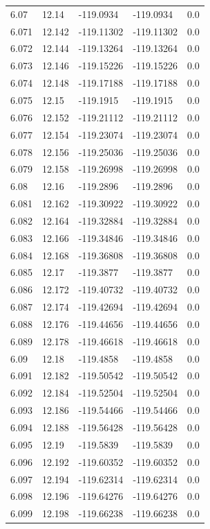 \begin{tabular}{lllll}
6.07 & 12.14 & -119.0934 & -119.0934 & 0.0 \\
6.071 & 12.142 & -119.11302 & -119.11302 & 0.0 \\
6.072 & 12.144 & -119.13264 & -119.13264 & 0.0 \\
6.073 & 12.146 & -119.15226 & -119.15226 & 0.0 \\
6.074 & 12.148 & -119.17188 & -119.17188 & 0.0 \\
6.075 & 12.15 & -119.1915 & -119.1915 & 0.0 \\
6.076 & 12.152 & -119.21112 & -119.21112 & 0.0 \\
6.077 & 12.154 & -119.23074 & -119.23074 & 0.0 \\
6.078 & 12.156 & -119.25036 & -119.25036 & 0.0 \\
6.079 & 12.158 & -119.26998 & -119.26998 & 0.0 \\
6.08 & 12.16 & -119.2896 & -119.2896 & 0.0 \\
6.081 & 12.162 & -119.30922 & -119.30922 & 0.0 \\
6.082 & 12.164 & -119.32884 & -119.32884 & 0.0 \\
6.083 & 12.166 & -119.34846 & -119.34846 & 0.0 \\
6.084 & 12.168 & -119.36808 & -119.36808 & 0.0 \\
6.085 & 12.17 & -119.3877 & -119.3877 & 0.0 \\
6.086 & 12.172 & -119.40732 & -119.40732 & 0.0 \\
6.087 & 12.174 & -119.42694 & -119.42694 & 0.0 \\
6.088 & 12.176 & -119.44656 & -119.44656 & 0.0 \\
6.089 & 12.178 & -119.46618 & -119.46618 & 0.0 \\
6.09 & 12.18 & -119.4858 & -119.4858 & 0.0 \\
6.091 & 12.182 & -119.50542 & -119.50542 & 0.0 \\
6.092 & 12.184 & -119.52504 & -119.52504 & 0.0 \\
6.093 & 12.186 & -119.54466 & -119.54466 & 0.0 \\
6.094 & 12.188 & -119.56428 & -119.56428 & 0.0 \\
6.095 & 12.19 & -119.5839 & -119.5839 & 0.0 \\
6.096 & 12.192 & -119.60352 & -119.60352 & 0.0 \\
6.097 & 12.194 & -119.62314 & -119.62314 & 0.0 \\
6.098 & 12.196 & -119.64276 & -119.64276 & 0.0 \\
6.099 & 12.198 & -119.66238 & -119.66238 & 0.0 \\

\end{tabular}

